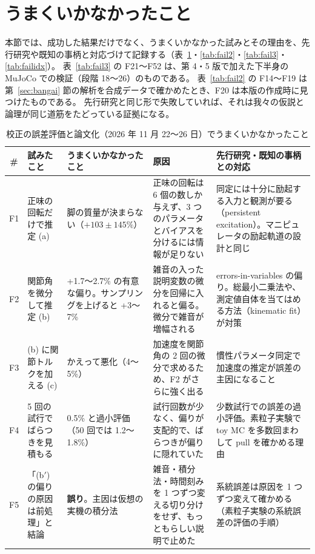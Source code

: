 \documentclass[paper=a4paper,fontsize=10pt,twocolumn,column_gap=2zw,line_length=24zw,number_of_lines=46,head_space=20mm]{jlreq}
\begin{document}
\section{うまくいかなかったこと}\label{sec:fail}

本節では、成功した結果だけでなく、うまくいかなかった試みとその理由を、先行研究や既知の事柄と対応づけて記録する（表~\ref{tab:fail}・\ref{tab:fail2}・\ref{tab:fail3}・\ref{tab:failidx}）。
表~\ref{tab:fail3} の F21〜F52 は、第 4・5 版で加えた下半身の MuJoCo での検証（段階 18〜26）のものである。
表~\ref{tab:fail2} の F14〜F19 は第~\ref{sec:bangai} 節の解析を合成データで確かめたとき、F20 は本版の作成時に見つけたものである。
先行研究と同じ形で失敗していれば、それは我々の仮説と論理が同じ道筋をたどっている証拠になる。

\begin{table}[t]\centering\footnotesize
\caption{校正の誤差評価と論文化（2026 年 11 月 22〜26 日）でうまくいかなかったこと}\label{tab:fail}
\setlength{\tabcolsep}{3pt}
\begin{tabular}{cp{}p{}p{}p{}}\toprule
\# & 試みたこと & うまくいかなかったこと & 原因 & 先行研究・既知の事柄との対応 \\\midrule
F1 & 正味の回転だけで推定 (a) & 脚の質量が決まらない（$+103\pm145\%$） & 正味の回転は 6 個の数しか与えず、3 つのパラメータとバイアスを分けるには情報が足りない & 同定には十分に励起する入力と観測が要る（persistent excitation）。マニピュレータの励起軌道の設計と同じ \\
F2 & 関節角を微分して推定 (b) & +1.7〜2.7\% の有意な偏り。サンプリングを上げると +3〜7\% & 雑音の入った説明変数の微分を回帰に入れると偏る。微分で雑音が増幅される & errors-in-variables の偏り。総最小二乗法や、測定値自体を当てはめる方法（kinematic fit）が対策 \\
F3 & (b) に関節トルクを加える (c) & かえって悪化（4〜5\%） & 加速度を関節角の 2 回の微分で求めるため、F2 がさらに強く出る & 慣性パラメータ同定で加速度の推定が誤差の主因になること \cite{atkeson1986} \\
F4 & 5 回の試行でばらつきを見積もる & 0.5\% と過小評価（50 回では 1.2〜1.8\%） & 試行回数が少なく、偏りが支配的で、ばらつきが偏りに隠れていた & 少数試行での誤差の過小評価。素粒子実験で toy MC を多数回まわして pull を確かめる理由 \\
F5 & 「(b$'$) の偏りの原因は前処理」と結論 & \textbf{誤り}。主因は仮想の実機の積分法 & 雑音・積分法・時間刻みを 1 つずつ変える切り分けをせず、もっともらしい説明で止めた & 系統誤差は原因を 1 つずつ変えて確かめる（素粒子実験の系統誤差の評価の手順） \\

\end{tabular}
\end{table}
\end{document}
